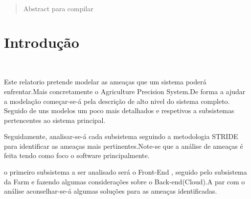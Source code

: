 
\begin{abstract} 
	Abstract para compilar

\end{abstract}
\clearpage

\section{Introdução}
\hfill\\
	\par Este relatorio pretende modelar as ameaças que um sistema poderá enfrentar.Mais concretamente o Agriculture Precision System.De forma a ajudar a modelação começar-se-á pela descrição de alto nivel do sistema completo. Seguido de uns modelos um poco mais detalhados e respetivos a subsistemas pertencentes ao sistema principal.
	
	Seguidamente, analisar-se-á cada subsistema seguindo a metodologia STRIDE para identificar as ameaças mais pertinentes.Note-se que a análise de ameaças é feita tendo como foco o software principalmente.
	
	o primeiro subsistema a ser analisado será o Front-End , seguido pelo subsistema da Farm e fazendo algumas considerações sobre o Back-end(Cloud).A par com o análise aconselhar-se-á algumas soluções para as ameaças identificadas.